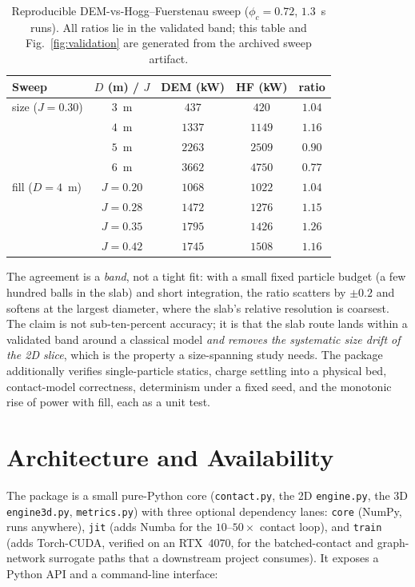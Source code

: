 \documentclass[journal]{IEEEtran}
\begin{document}
\begin{table}[!t]
\centering
\caption{Reproducible DEM-vs-Hogg--Fuerstenau sweep ($\phi_c=0.72$, $1.3$~s runs). All ratios lie in the
validated band; this table and Fig.~\ref{fig:validation} are generated from the archived sweep artifact.}
\label{tab:sweep}
\footnotesize
\begin{tabular}{@{}l c c c c@{}}
\toprule
Sweep & $D$ (m) / $J$ & DEM (kW) & HF (kW) & ratio \\
\midrule
size ($J{=}0.30$) & $3$~m & $437$ & $420$ & $1.04$ \\
                  & $4$~m & $1337$ & $1149$ & $1.16$ \\
                  & $5$~m & $2263$ & $2509$ & $0.90$ \\
                  & $6$~m & $3662$ & $4750$ & $0.77$ \\
\midrule
fill ($D{=}4$~m)  & $J{=}0.20$ & $1068$ & $1022$ & $1.04$ \\
                  & $J{=}0.28$ & $1472$ & $1276$ & $1.15$ \\
                  & $J{=}0.35$ & $1795$ & $1426$ & $1.26$ \\
                  & $J{=}0.42$ & $1745$ & $1508$ & $1.16$ \\
\bottomrule
\end{tabular}
\end{table}

The agreement is a \emph{band}, not a tight fit: with a
small fixed particle budget (a few hundred balls in the slab) and short integration, the ratio scatters by
$\pm0.2$ and softens at the largest diameter, where the slab's relative resolution is coarsest. The claim is not
sub-ten-percent accuracy; it is that the slab route lands within a validated band around a classical model
\emph{and removes the systematic size drift of the 2D slice}, which is the property a size-spanning study needs.
The package additionally verifies single-particle statics, charge settling into a physical bed, contact-model
correctness, determinism under a fixed seed, and the monotonic rise of power with fill, each as a unit test.

\section{Architecture and Availability}\label{sec:arch}

The package is a small pure-Python core (\texttt{contact.py}, the 2D \texttt{engine.py}, the 3D
\texttt{engine3d.py}, \texttt{metrics.py}) with three optional dependency lanes: \texttt{core} (NumPy, runs
anywhere), \texttt{jit} (adds Numba for the $10$--$50\times$ contact loop), and \texttt{train} (adds Torch-CUDA,
verified on an RTX~4070, for the batched-contact and graph-network surrogate paths that a downstream project
consumes). It exposes a Python API and a command-line interface:
\end{document}

